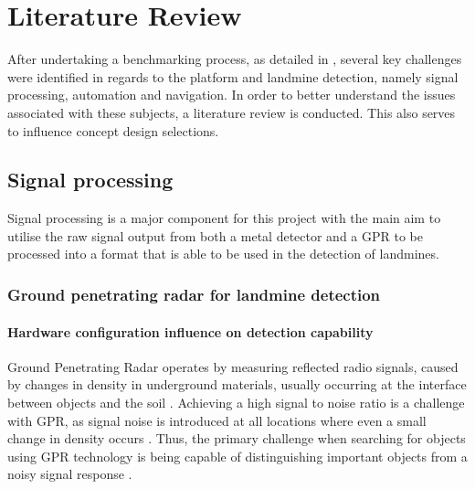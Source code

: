 \documentclass[main.tex]{subfiles}
\begin{document}
\chapter{Literature Review}
After undertaking a benchmarking process, as detailed in , several key challenges were identified in regards to the platform and landmine detection, namely signal processing, automation and navigation. In order to better understand the issues associated with these subjects, a literature review is conducted. This also serves to influence concept design selections. 

\section{Signal processing}
Signal processing is a major component for this project with the main aim to utilise the raw signal output from both a metal detector and a GPR to be processed into a format that is able to be used in the detection of landmines.  
\subsection{Ground penetrating radar for landmine detection}
\subsubsection{Hardware configuration influence on detection capability}
Ground Penetrating Radar operates by measuring reflected radio signals, caused by changes in density in underground materials, usually occurring at the interface between objects and the soil \parencite{sakaguchi2014}. Achieving a high signal to noise ratio is a challenge with GPR, as signal noise is introduced at all locations where even a small change in density occurs \parencite{shresta2003}. Thus, the primary challenge when searching for objects using GPR technology is being capable of distinguishing important objects from a noisy signal response \parencite{sakaguchi2014}.
\end{document}
